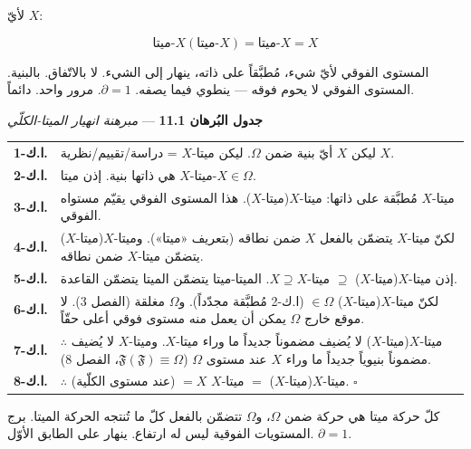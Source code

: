 \documentclass[10pt, openany, oneside]{book}
\renewcommand{\footnotesize}{\fontsize{8.5}{11}\selectfont}
\begin{document}
\noindent لأيّ $X$:

$$\text{ميتا-}X(\text{ميتا-}X) = \text{ميتا-}X = X$$

المستوى الفوقي لأيّ شيء، مُطبَّقاً على ذاته، ينهار إلى الشيء. لا بالاتّفاق. بالبنية. المستوى الفوقي لا يحوم فوقه --- ينطوي فيما يصفه. $\partial = 1$. مرور واحد. دائماً.

\vspace{0.5em}

\textbf{جدول البُرهان 11.1} --- \textit{مبرهنة انهيار الميتا-الكلّي}

\vspace{0.5em}

{\footnotesize
\noindent\begin{tabular}{r p{}}
\textbf{ا.ك-1.} & ليكن $X$ أيّ بنية ضمن $\Omega$. ليكن ميتا-$X$ = دراسة/تقييم/نظرية $X$. \\[0.3em]
\textbf{ا.ك-2.} & ميتا-$X$ هي ذاتها بنية. إذن ميتا-$X \in \Omega$. \\[0.3em]
\textbf{ا.ك-3.} & ميتا-$X$ مُطبَّقة على ذاتها: ميتا-$X$(ميتا-$X$). هذا المستوى الفوقي يقيّم مستواه الفوقي. \\[0.3em]
\textbf{ا.ك-4.} & لكنّ ميتا-$X$ يتضمّن بالفعل $X$ ضمن نطاقه (بتعريف «ميتا»). وميتا-$X$(ميتا-$X$) يتضمّن ميتا-$X$ ضمن نطاقه. \\[0.3em]
\textbf{ا.ك-5.} & إذن ميتا-$X$(ميتا-$X$) $\supseteq$ ميتا-$X \supseteq X$. الميتا-ميتا يتضمّن الميتا يتضمّن القاعدة. \\[0.3em]
\textbf{ا.ك-6.} & لكنّ ميتا-$X$(ميتا-$X$) $\in \Omega$ (ا.ك-2 مُطبَّقة مجدّداً). و$\Omega$ مغلقة (الفصل 3). لا موقع خارج $\Omega$ يمكن أن يعمل منه مستوى فوقي أعلى حقّاً. \\[0.3em]
\textbf{ا.ك-7.} & $\therefore$ ميتا-$X$(ميتا-$X$) لا يُضيف مضموناً جديداً ما وراء ميتا-$X$. وميتا-$X$ لا يُضيف مضموناً بنيوياً جديداً ما وراء $X$ عند مستوى $\Omega$ ($\mathfrak{F}(\mathfrak{F}) \equiv \Omega$، الفصل 8). \\[0.3em]
\textbf{ا.ك-8.} & $\therefore$ ميتا-$X$(ميتا-$X$) $=$ ميتا-$X$ $= X$ (عند مستوى الكلّية). $\square$ \\[0.3em]
\end{tabular}
}

\vspace{0.8em}

\noindent كلّ حركة ميتا هي حركة ضمن $\Omega$، و$\Omega$ تتضمّن بالفعل كلّ ما تُنتجه الحركة الميتا. برج المستويات الفوقية ليس له ارتفاع. ينهار على الطابق الأوّل. $\partial = 1$.

\vspace{1.5em}
\end{document}
